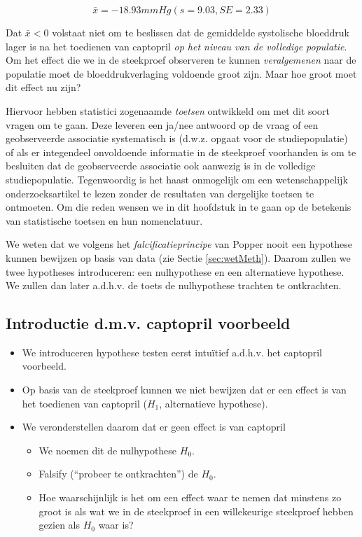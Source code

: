 \documentclass[
  12pt,dutch,coursenotes]{book}
\theoremstyle{definition}
\theoremstyle{definition}
\theoremstyle{definition}
\theoremstyle{definition}
\theoremstyle{remark}
\begin{document}
\[\bar x=-18.93mmHg (s = 9.03, SE = 2.33)\]

Dat \(\bar{x}< 0\) volstaat niet om te beslissen dat de gemiddelde systolische bloeddruk lager is na het toedienen van captopril \emph{op het niveau van de volledige populatie}. Om het effect die we in de steekproef observeren te kunnen \emph{veralgemenen} naar de populatie moet de bloeddrukverlaging voldoende groot zijn. Maar hoe groot moet dit effect nu zijn?

Hiervoor hebben statistici zogenaamde \emph{toetsen} ontwikkeld om met dit soort vragen om te gaan. Deze leveren een ja/nee antwoord op de vraag of een geobserveerde associatie systematisch is (d.w.z. opgaat voor de studiepopulatie) of als er integendeel onvoldoende informatie in de steekproef voorhanden is om te besluiten dat de geobserveerde associatie ook aanwezig is in de volledige studiepopulatie. Tegenwoordig is het
haast onmogelijk om een wetenschappelijk onderzoeksartikel te lezen zonder
de resultaten van dergelijke toetsen te ontmoeten. Om die reden wensen we in
dit hoofdstuk in te gaan op de betekenis van statistische toetsen en hun
nomenclatuur.

We weten dat we volgens het \emph{falcificatieprincipe} van Popper nooit een hypothese kunnen bewijzen op basis van data (zie Sectie \ref{sec:wetMeth}).
Daarom zullen we twee hypotheses introduceren: een nulhypothese en een alternatieve hypothese.
We zullen dan later a.d.h.v. de toets de nulhypothese trachten te ontkrachten.

\hypertarget{introductie-d.m.v.-captopril-voorbeeld}{%
\subsection{Introductie d.m.v. captopril voorbeeld}\label{introductie-d.m.v.-captopril-voorbeeld}}

\begin{itemize}
\item
  We introduceren hypothese testen eerst intuïtief a.d.h.v. het captopril voorbeeld.
\item
  Op basis van de steekproef kunnen we niet bewijzen dat er een effect is van het toedienen van captopril (\(H_1\), alternatieve hypothese).
\item
  We veronderstellen daarom dat er geen effect is van captopril

  \begin{itemize}
  \item
    We noemen dit de nulhypothese \(H_0\).
  \item
    Falsify (``probeer te ontkrachten'') de \(H_0\).
  \item
    Hoe waarschijnlijk is het om een effect waar te nemen dat minstens zo groot is als wat we in de steekproef in een willekeurige steekproef hebben gezien als \(H_0\) waar is?
  \end{itemize}
\end{itemize}
\end{document}
